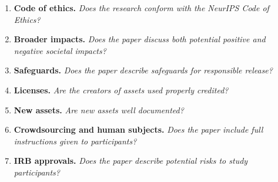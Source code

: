 \documentclass[11pt]{article}
\begin{document}
\begin{enumerate}[leftmargin=2em,itemsep=4pt]
\item \textbf{Code of ethics.}
\textit{Does the research conform with the NeurIPS Code of Ethics?}
\answerYes{}

\item \textbf{Broader impacts.}
\textit{Does the paper discuss both potential positive and negative societal impacts?}

\item \textbf{Safeguards.}
\textit{Does the paper describe safeguards for responsible release?}

\item \textbf{Licenses.}
\textit{Are the creators of assets used properly credited?}

\item \textbf{New assets.}
\textit{Are new assets well documented?}

\item \textbf{Crowdsourcing and human subjects.}
\textit{Does the paper include full instructions given to participants?}

\item \textbf{IRB approvals.}
\textit{Does the paper describe potential risks to study participants?}

\end{enumerate}
\end{document}
